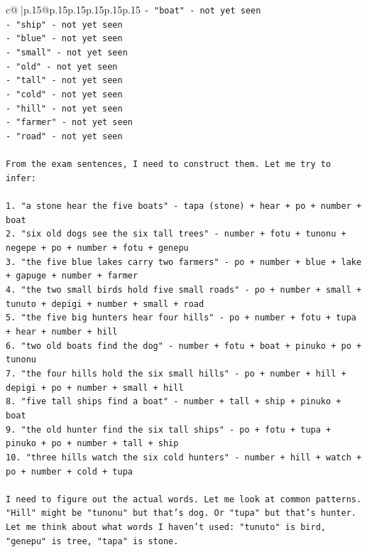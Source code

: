 \documentclass{article}
\begin{document}
{\begin{supertabular}{c@{$\;$}|p{.15\linewidth}@{}p{.15\linewidth}p{.15\linewidth}p{.15\linewidth}p{.15\linewidth}p{.15\linewidth}}
{{{\texttt{{-} "boat" {-} not yet seen} \\
\texttt{{-} "ship" {-} not yet seen} \\
\texttt{{-} "blue" {-} not yet seen} \\
\texttt{{-} "small" {-} not yet seen} \\
\texttt{{-} "old" {-} not yet seen} \\
\texttt{{-} "tall" {-} not yet seen} \\
\texttt{{-} "cold" {-} not yet seen} \\
\texttt{{-} "hill" {-} not yet seen} \\
\texttt{{-} "farmer" {-} not yet seen} \\
\texttt{{-} "road" {-} not yet seen} \\
\\ 
\texttt{From the exam sentences, I need to construct them. Let me try to infer:} \\
\\ 
\texttt{1. "a stone hear the five boats" {-} tapa (stone) + hear + po + number + boat} \\
\texttt{2. "six old dogs see the six tall trees" {-} number + fotu + tunonu + negepe + po + number + fotu + genepu} \\
\texttt{3. "the five blue lakes carry two farmers" {-} po + number + blue + lake + gapuge + number + farmer} \\
\texttt{4. "the two small birds hold five small roads" {-} po + number + small + tunuto + depigi + number + small + road} \\
\texttt{5. "the five big hunters hear four hills" {-} po + number + fotu + tupa + hear + number + hill} \\
\texttt{6. "two old boats find the dog" {-} number + fotu + boat + pinuko + po + tunonu} \\
\texttt{7. "the four hills hold the six small hills" {-} po + number + hill + depigi + po + number + small + hill} \\
\texttt{8. "five tall ships find a boat" {-} number + tall + ship + pinuko + boat} \\
\texttt{9. "the old hunter find the six tall ships" {-} po + fotu + tupa + pinuko + po + number + tall + ship} \\
\texttt{10. "three hills watch the six cold hunters" {-} number + hill + watch + po + number + cold + tupa} \\
\\ 
\texttt{I need to figure out the actual words. Let me look at common patterns. "Hill" might be "tunonu" but that's dog. Or "tupa" but that's hunter. Let me think about what words I haven't used: "tunuto" is bird, "genepu" is tree, "tapa" is stone.} \\
}}}
\end{supertabular}}
\end{document}
